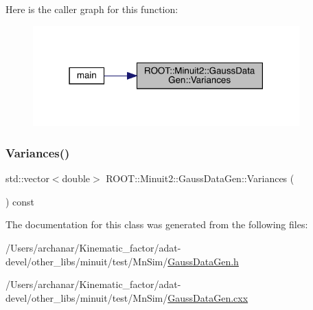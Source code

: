 Here is the caller graph for this function\+:
\nopagebreak
\begin{figure}[H]
\begin{center}
\leavevmode
\includegraphics[width=291pt]{d8/d75/classROOT_1_1Minuit2_1_1GaussDataGen_ab2f22917ba4f242a2888c908a8629260_icgraph}
\end{center}
\end{figure}
\mbox{\label{classROOT_1_1Minuit2_1_1GaussDataGen_ab2f22917ba4f242a2888c908a8629260}} 
\subsubsection{\texorpdfstring{Variances()}{Variances()}\hspace{0.1cm}{\footnotesize\ttfamily [2/2]}}
{\footnotesize\ttfamily std\+::vector$<$double$>$ R\+O\+O\+T\+::\+Minuit2\+::\+Gauss\+Data\+Gen\+::\+Variances (\begin{DoxyParamCaption}{ }\end{DoxyParamCaption}) const\hspace{0.3cm}{\ttfamily [inline]}}



The documentation for this class was generated from the following files\+:\begin{DoxyCompactItemize}
\item 
/\+Users/archanar/\+Kinematic\+\_\+factor/adat-\/devel/other\+\_\+libs/minuit/test/\+Mn\+Sim/\mbox{\hyperlink{adat-devel_2other__libs_2minuit_2test_2MnSim_2GaussDataGen_8h}{Gauss\+Data\+Gen.\+h}}\item 
/\+Users/archanar/\+Kinematic\+\_\+factor/adat-\/devel/other\+\_\+libs/minuit/test/\+Mn\+Sim/\mbox{\hyperlink{adat-devel_2other__libs_2minuit_2test_2MnSim_2GaussDataGen_8cxx}{Gauss\+Data\+Gen.\+cxx}}\end{DoxyCompactItemize}
